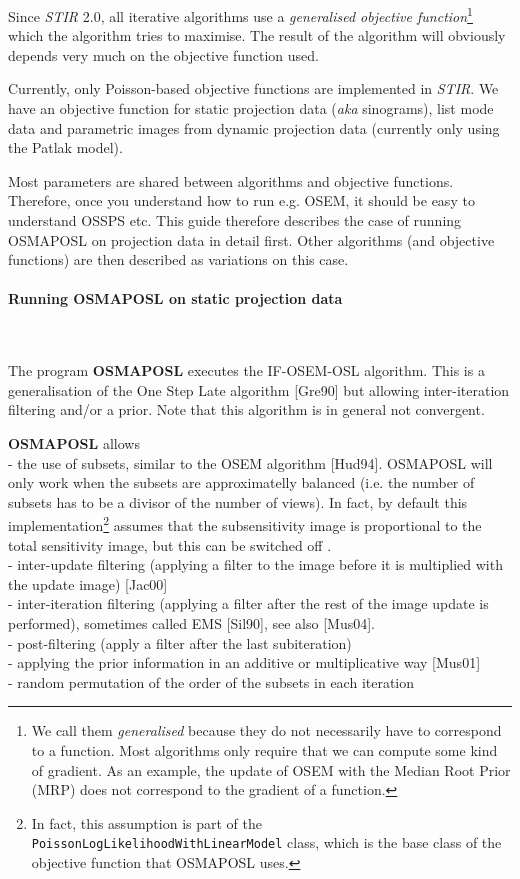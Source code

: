 \documentclass{article}
\newcommand{\tab}{\hspace{5mm}}
\newcommand{\subsubsubsection}[1]{\paragraph{#1}\mbox{} \\}
\begin{document}
Since \textit{STIR} 2.0, all iterative algorithms use a \textit{generalised objective 
function}\footnote{We call them \textit{generalised} because they do not
necessarily have to correspond to a function. Most algorithms only require
that we can compute some kind of gradient. As an example, the update
of OSEM with the Median Root Prior (MRP) does not correspond to the
gradient of a function.} which the algorithm tries to maximise. The result
of the algorithm will obviously depends very much on the objective function
used.

Currently, only Poisson-based objective functions are implemented in \textit{STIR}. We
have an objective function for static projection data (\textit{aka} sinograms),
list mode data and parametric images from dynamic projection data 
(currently only using the Patlak model).

Most parameters are shared between algorithms and objective functions. Therefore,
once you understand how to run e.g. OSEM, it should be easy to understand OSSPS etc.
This guide therefore describes the case of running OSMAPOSL on projection data in detail
first. Other algorithms (and objective functions) are then described as variations on this
case.

{ \subsubsubsection{Running OSMAPOSL on static projection data}
}
\label{sec:OSMAPOSL}

The program \textbf{OSMAPOSL} executes the IF-OSEM-OSL algorithm. 
This is a generalisation of the One Step Late algorithm [Gre90] but allowing
inter-iteration filtering and/or a prior. Note that this 
algorithm is in general not convergent.

\textbf{OSMAPOSL} 
allows \\
-\tab 
the use of subsets, similar to the OSEM algorithm [Hud94]. OSMAPOSL
will only work when the subsets are approximatelly balanced (i.e.
the number of subsets has to be a divisor of the number of views).
In fact, by default this implementation\footnote{In fact, this assumption
is part of the \texttt{PoissonLogLikelihoodWithLinearModel} class, which is
the base class of the objective function that OSMAPOSL uses.} assumes that the 
subsensitivity image is proportional to the total sensitivity image,
but this can be switched off .\\
-\tab 
inter-update filtering (applying a filter to the image before 
it is multiplied with the update image) [Jac00]\\
-\tab 
inter-iteration filtering (applying a filter after the rest of 
the image update is performed), sometimes called EMS [Sil90], 
see also [Mus04].\\
-\tab 
post-filtering (apply a filter after the last subiteration)\\
-\tab 
applying the prior information in an additive or multiplicative 
way [Mus01]\\
-\tab 
random permutation of the order of the subsets in each iteration
\end{document}
